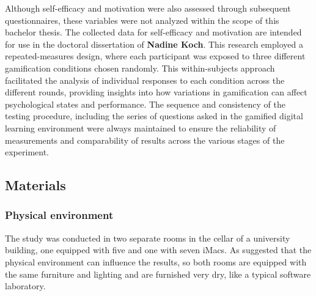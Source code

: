 Although self-efficacy and motivation were also assessed \parencite{chenValidationNewGeneral2001,guayAssessmentSituationalIntrinsic2000} through subsequent questionnaires, these variables were not analyzed within the scope of this bachelor thesis.
The collected data for self-efficacy and motivation are intended for use in the doctoral dissertation of \textbf{Nadine Koch}.
This research employed a repeated-measures design, where each participant was exposed to three different gamification conditions chosen randomly.
This within-subjects approach facilitated the analysis of individual responses to each condition across the different rounds, providing insights into how variations in gamification can affect psychological states and performance.
The sequence and consistency of the testing procedure, including the series of questions asked in the gamified digital learning environment were always maintained to ensure the reliability of measurements and comparability of results across the various stages of the experiment.


\subsection{Materials}
\subsubsection{Physical environment}
The study was conducted in two separate rooms in the cellar of a university building, one equipped with five and one with seven iMacs.
As \textcite{christyLeaderboardsVirtualClassroom2014} suggested that the physical environment can influence the results, so both rooms are equipped with the same furniture and lighting and are furnished very dry, like a typical software laboratory.

